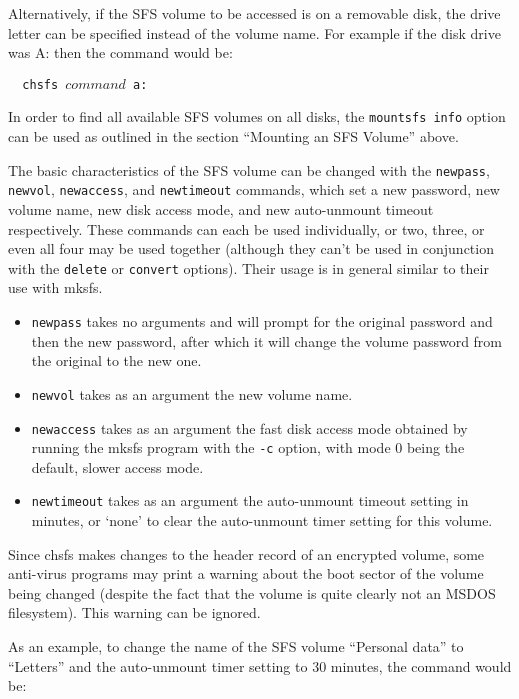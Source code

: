 Alternatively, if the SFS volume to be accessed is on a removable disk, the
drive letter can be specified instead of the volume name.  For example if the
disk drive was A: then the command would be:

{\tt \verb|  |chsfs $command$ a:}

In order to find all available SFS volumes on all disks, the {\tt mountsfs info}
option can be used as outlined in the section ``Mounting an SFS Volume'' above.

The basic characteristics of the SFS volume can be changed with the {\tt newpass},
{\tt newvol}, {\tt newaccess}, and {\tt newtimeout} commands, which set a new password, 
new volume name, new disk access mode, and new auto-unmount timeout respectively.  
These commands can each be used individually, or two, three, or even all four 
may be used together (although they can't be used in conjunction with the 
{\tt delete} or {\tt convert} options).  Their usage is in general similar to their use 
with mksfs.  

\begin{itemize}

\item {\tt newpass} takes no arguments and will prompt for the original password and 
    then the new password, after which it will change the volume password from the 
    original to the new one. 

\item {\tt newvol} takes as an argument the new volume name. 

\item {\tt newaccess} takes as an argument the fast disk access mode obtained by
    running the mksfs program with the {\tt -c} option, with mode 0 being the
    default, slower access mode. 

\item {\tt newtimeout} takes as an argument the auto-unmount timeout setting in
    minutes, or `none' to clear the auto-unmount timer setting for this volume.

\end{itemize}

Since chsfs makes changes to the header record of an encrypted volume, some
anti-virus programs may print a warning about the boot sector of the volume
being changed (despite the fact that the volume is quite clearly not an MSDOS
filesystem).  This warning can be ignored.

As an example, to change the name of the SFS volume ``Personal data'' to 
``Letters'' and the auto-unmount timer setting to 30 minutes, the command would
be:

